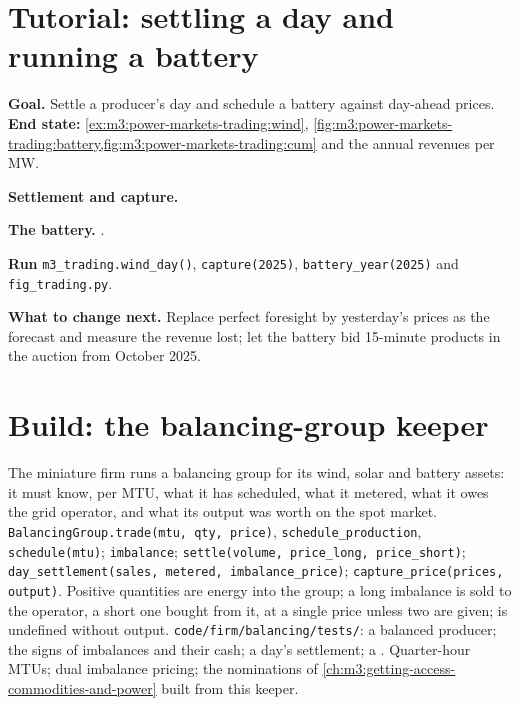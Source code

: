 \section{Tutorial: settling a day and running a battery}\label{tut:m3:power-markets-trading:battery}

\begin{tutorial}
\textbf{Goal.} Settle a producer's day and schedule a battery against day-ahead prices.
\textbf{End state:} \cref{ex:m3:power-markets-trading:wind},
\cref{fig:m3:power-markets-trading:battery,fig:m3:power-markets-trading:cum} and the annual
revenues per MW.
\begin{tutsteps}
\item \textbf{Settlement and capture.}
\label{lst:m3:power-markets-trading:settle}
\item \textbf{The battery.} .
\label{lst:m3:power-markets-trading:dp}
\item \textbf{Run} \texttt{m3\_trading.wind\_day()}, \texttt{capture(2025)},
\texttt{battery\_year(2025)} and \texttt{fig\_trading.py}.
\end{tutsteps}
\textbf{What to change next.} Replace perfect foresight by yesterday's prices as the forecast
and measure the revenue lost; let the battery bid 15-minute products in the auction from
October 2025.
\end{tutorial}

\section{Build: the balancing-group keeper}\label{bld:m3:power-markets-trading:balancing}

\begin{build}
 The miniature firm runs a balancing group for its wind, solar and battery
assets: it must know, per MTU, what it has scheduled, what it metered, what it owes the grid
operator, and what its output was worth on the spot market.
 \texttt{BalancingGroup.trade(mtu, qty, price)},
\texttt{schedule\_production}, \texttt{schedule(mtu)}; \texttt{imbalance};
\texttt{settle(volume, price\_long, price\_short)}; \texttt{day\_settlement(sales, metered,
imbalance\_price)}; \texttt{capture\_price(prices, output)}.
 Positive quantities are energy into the group; a long imbalance is sold to the
operator, a short one bought from it, at a single price unless two are given;  is
undefined without output.
 \texttt{code/firm/balancing/tests/}: a balanced producer; the signs of
imbalances and their cash; a day's settlement; a .
 Quarter-hour MTUs; dual imbalance pricing; the nominations of
\cref{ch:m3:getting-access-commodities-and-power} built from this keeper.
\end{build}

